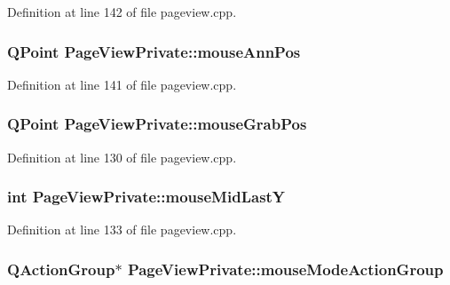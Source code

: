 Definition at line 142 of file pageview.\+cpp.

\hypertarget{classPageViewPrivate_a1cc45a684f1f05e522c4874d017858cb}{
\subsubsection[{mouse\+Ann\+Pos}]{\setlength{\rightskip}{0pt plus 5cm}Q\+Point Page\+View\+Private\+::mouse\+Ann\+Pos}}\label{classPageViewPrivate_a1cc45a684f1f05e522c4874d017858cb}


Definition at line 141 of file pageview.\+cpp.

\hypertarget{classPageViewPrivate_aa02b40a75cef0ee7f1b423027a80c8d6}{
\subsubsection[{mouse\+Grab\+Pos}]{\setlength{\rightskip}{0pt plus 5cm}Q\+Point Page\+View\+Private\+::mouse\+Grab\+Pos}}\label{classPageViewPrivate_aa02b40a75cef0ee7f1b423027a80c8d6}


Definition at line 130 of file pageview.\+cpp.

\hypertarget{classPageViewPrivate_a0962e2c6de7921af1c3e42cae846bd65}{
\subsubsection[{mouse\+Mid\+Last\+Y}]{\setlength{\rightskip}{0pt plus 5cm}int Page\+View\+Private\+::mouse\+Mid\+Last\+Y}}\label{classPageViewPrivate_a0962e2c6de7921af1c3e42cae846bd65}


Definition at line 133 of file pageview.\+cpp.

\hypertarget{classPageViewPrivate_ae7b75854286f78f9b871f99bebb1eb73}{
\subsubsection[{mouse\+Mode\+Action\+Group}]{\setlength{\rightskip}{0pt plus 5cm}Q\+Action\+Group$\ast$ Page\+View\+Private\+::mouse\+Mode\+Action\+Group}}\label{classPageViewPrivate_ae7b75854286f78f9b871f99bebb1eb73}


